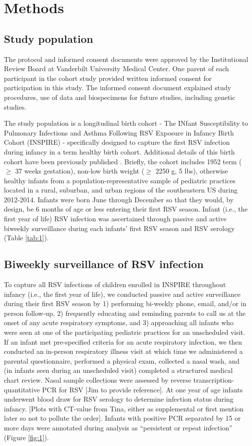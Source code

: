 \documentclass{article}
\begin{document}
\section{Methods}
\subsection{Study population}
The protocol and informed consent documents were approved by the Institutional Review Board at Vanderbilt University Medical Center. 
One parent of each participant in the cohort study provided written informed consent for participation in this study. 
The informed consent document explained study procedures, use of data and biospecimens for future studies, including genetic studies.

The study population is a longitudinal birth cohort - The INfant Susceptibility to Pulmonary Infections and Asthma Following RSV Exposure in Infancy Birth Cohort (INSPIRE) - specifically designed to capture the first RSV infection during infancy in a term healthy birth cohort. 
Additional details of this birth cohort have been previously published 
\cite{larkin_objectives_2015}.
Briefly, the cohort includes 1952 term ($\ge$ 37 weeks gestation), non-low birth weight ($\ge$ 2250 g, 5 lbs), otherwise healthy infants from a population-representative sample of pediatric practices located in a rural, suburban, and urban regions of the southeastern US during 2012-2014. 
Infants were born June through December so that they would, by design, be 6 months of age or less entering their first RSV season. 
Infant (i.e., the first year of life) RSV infection was ascertained through passive and active biweekly surveillance during each infants' first RSV season and RSV serology
(Table \ref{tab:1}).

\subsection{Biweekly surveillance of RSV infection}
To capture all RSV infections of children enrolled in INSPIRE throughout infancy (i.e., the first year of life), we conducted passive and active surveillance during their first RSV season by 1) performing bi-weekly phone, email, and/or in person follow-up, 2) frequently educating and reminding parents to call us at the onset of any acute respiratory symptoms, and 3) approaching all infants who were seen at one of the participating pediatric practices for an unscheduled visit. 
If an infant met pre-specified criteria for an acute respiratory infection, we then conducted an in-person respiratory illness visit at which time we administered a parental questionnaire, performed a physical exam, collected a nasal wash, and (in infants seen during an unscheduled visit) completed a structured medical chart review.
Nasal sample collections were assessed by reverse transcription-quantitative PCR for RSV [Jim to provide reference].
At one year of age infants underwent blood draw for RSV serology to determine infection status during infancy. 
[Plots with CT-value from Tina, either as supplemental or first mention later so not to pollute the order].
Infants with positive PCR separated by 15 or more days were annotated during analysis as ``persistent or repeat infection''
(Figure \ref{fig:1}).
\end{document}
